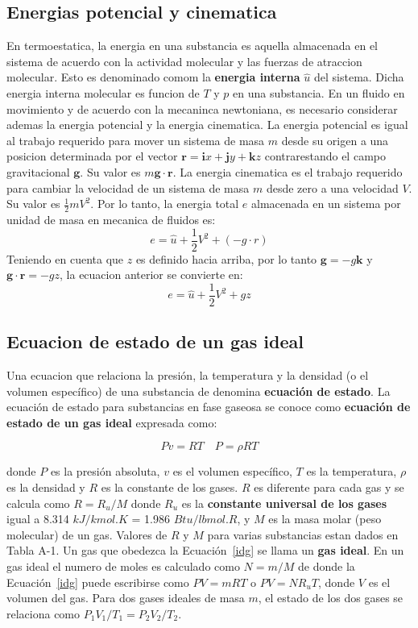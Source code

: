 \documentclass[10pt, oneside]{article}
\begin{document}
\subsection{Energias potencial y cinematica}
En termoestatica, la energia en una substancia es aquella almacenada en el sistema de acuerdo con la actividad molecular y las fuerzas de atraccion molecular. Esto es denominado comom la \textbf{energia interna} $\hat{u}$ del sistema. Dicha energia interna molecular es funcion de $T$ y $p$ en una substancia. En un fluido en movimiento y de acuerdo con la mecaninca newtoniana, es necesario considerar ademas la energia potencial y la energia cinematica. La energia potencial es igual al trabajo requerido para mover un sistema de masa $m$ desde su origen a una posicion determinada por el vector $\mathbf{r}=\mathbf{i}x + \mathbf{j}y + \mathbf{k}z$ contrarestando el campo gravitacional $\mathbf{g}$. Su valor es $m\mathbf{g}\cdot \mathbf{r}$. La energia cinematica es el trabajo requerido para cambiar la velocidad de un sistema de masa $m$ desde zero a una velocidad $V$. Su valor es $\frac{1}{2}mV^2$. Por lo tanto, la energia total $e$ almacenada en un sistema por unidad de masa en mecanica de fluidos es:
$$
e=\hat{u}+\frac{1}{2}V^2 + (-g\cdot r)
$$
Teniendo en cuenta que $z$ es definido hacia arriba, por lo tanto $\mathbf{g}=-g\mathbf{k}$ y $\mathbf{g}\cdot \mathbf{r}=-gz$, la ecuacion anterior se convierte en:
$$
e=\hat{u}+\frac{1}{2}V^2 + gz
$$

\subsection{Ecuacion de estado de un gas ideal}
Una ecuacion  que relaciona la presi\'on, la temperatura y la densidad (o el volumen espec\'ifico) de una substancia de denomina \textbf{ecuaci\'on de estado}. La ecuaci\'on de estado para substancias en fase gaseosa se conoce como \textbf{ecuaci\'on de estado de un gas ideal} expresada como:

\begin{equation}
Pv=RT  \quad P=\rho R T
\label{idg}
\end{equation}

donde $P$ es la presi\'on absoluta, $v$ es el volumen espec\'ifico, $T$ es la temperatura, $\rho$ es la densidad y $R$ es la constante de los gases. $R$ es diferente para cada gas y se calcula como $R=R_u /M$ donde $R_u$ es la \textbf{constante universal de los gases} igual a 8.314 $kJ/kmol.K$ = 1.986 $Btu/lbmol.R$, y $M$ es la masa molar (peso molecular) de un gas. Valores de $R$ y $M$ para varias substancias estan dados en Tabla A-1. Un gas que obedezca la Ecuaci\'on~\ref{idg} se llama un \textbf{gas ideal}. En un gas ideal el numero de moles es calculado como $N=m/M$ de donde la Ecuaci\'on~\ref{idg} puede escribirse como $PV=mRT$ o $PV=NR_u T$, donde $V$ es el volumen del gas. Para dos gases ideales de masa $m$, el estado de los dos gases se relaciona como $P_1 V_1 / T_1 = P_2 V_2 / T_2$. 
\end{document}
